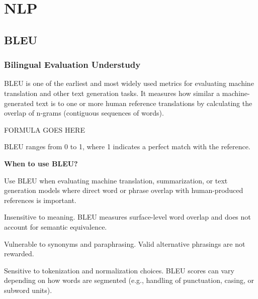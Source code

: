 \chapter{NLP}


\clearpage
\thispagestyle{nlpstyle}
\section{BLEU}
\subsection{Bilingual Evaluation Understudy}



BLEU is one of the earliest and most widely used metrics for evaluating machine translation and other
text generation tasks. It measures how similar a machine-generated text is to one or more human
reference translations by calculating the overlap of n-grams (contiguous sequences of words).

\begin{center}
    FORMULA GOES HERE
\end{center}

BLEU ranges from 0 to 1, where 1 indicates a perfect match with the reference.

\textbf{When to use BLEU?}

Use BLEU when evaluating machine translation, summarization, or text generation models where direct
word or phrase overlap with human-produced references is important.

{
\item Insensitive to meaning. BLEU measures surface-level word overlap and does not account for
semantic equivalence.
\item Vulnerable to synonyms and paraphrasing. Valid alternative phrasings are not rewarded.
\item Sensitive to tokenization and normalization choices. BLEU scores can vary depending on how words
are segmented (e.g., handling of punctuation, casing, or subword units).
}

